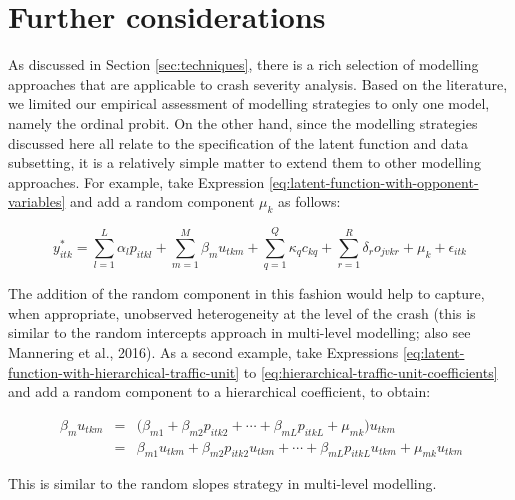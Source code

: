 \documentclass[]{elsarticle} %
\begin{document}
\hypertarget{sec:further-considerations}{%
\section{Further considerations}\label{sec:further-considerations}}

As discussed in Section \ref{sec:techniques}, there is a rich selection
of modelling approaches that are applicable to crash severity analysis.
Based on the literature, we limited our empirical assessment of
modelling strategies to only one model, namely the ordinal probit. On
the other hand, since the modelling strategies discussed here all relate
to the specification of the latent function and data subsetting, it is a
relatively simple matter to extend them to other modelling approaches.
For example, take Expression
\ref{eq:latent-function-with-opponent-variables} and add a random
component \(\mu_{k}\) as follows:

\begin{equation}
\label{eq:latent-function-with-opponent-variables-and-random-component}
y_{itk}^*=\sum_{l=1}^L\alpha_lp_{itkl} + \sum_{m=1}^M\beta_mu_{tkm} + \sum_{q=1}^Q\kappa_qc_{kq} + \sum_{r=1}^R\delta_ro_{jvkr} + \mu_{k} + \epsilon_{itk}
\end{equation}

The addition of the random component in this fashion would help to
capture, when appropriate, unobserved heterogeneity at the level of the
crash (this is similar to the random intercepts approach in multi-level
modelling; also see Mannering et al., 2016). As a second example, take
Expressions \ref{eq:latent-function-with-hierarchical-traffic-unit} to
\ref{eq:hierarchical-traffic-unit-coefficients} and add a random
component to a hierarchical coefficient, to obtain:

\begin{equation}
\label{eq:hierarchical-traffic-unit-coefficients-with-random-component}
\begin{array}{rcl}\
\beta_{m}u_{tkm} &=& \big( \beta_{m1} + \beta_{m2}p_{itk2} + \cdots + \beta_{mL}p_{itkL} + \mu_{mk}\big)u_{tkm}\\ 
&=& \beta_{m1}u_{tkm} + \beta_{m2}p_{itk2}u_{tkm} + \cdots + \beta_{mL}p_{itkL}u_{tkm} + \mu_{mk}u_{tkm}
\end{array}
\end{equation}

This is similar to the random slopes strategy in multi-level modelling.
\end{document}
